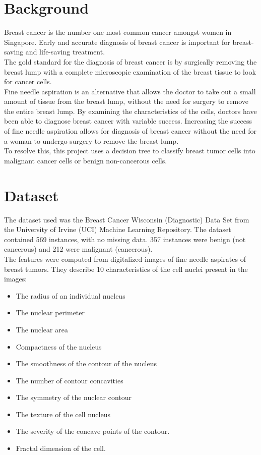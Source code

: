 
\section{Background}
Breast cancer is the number one most common cancer amongst women in Singapore. Early and accurate diagnosis of breast cancer is important for breast-saving and life-saving treatment. \\

The gold standard for the diagnosis of breast cancer is by surgically removing the breast lump with a complete microscopic examination of the breast tissue to look for cancer cells. \\

Fine needle aspiration is an alternative that allows the doctor to take out a small amount of tissue from the breast lump, without the need for surgery to remove the entire breast lump. By examining the characteristics of the cells, doctors have been able to diagnose breast cancer with variable success. Increasing the success of fine needle aspiration allows for diagnosis of breast cancer without the need for a woman to undergo surgery to remove the breast lump. \\

To resolve this, this project uses a decision tree to classify breast tumor cells into malignant cancer cells or benign non-cancerous cells. \\

\section{Dataset}
The dataset used was the Breast Cancer Wisconsin (Diagnostic) Data Set from the University of Irvine (UCI) Machine Learning Repository. The dataset contained 569 instances, with no missing data. 357 instances were benign (not cancerous) and 212 were malignant (cancerous). \\

The features were computed from digitalized images of fine needle aspirates of breast tumors. They describe 10 characteristics of the cell nuclei present in the images:

\begin{itemize}
	\item The radius of an individual nucleus
	\item The nuclear perimeter
	\item The nuclear area
	\item Compactness of the nucleus
	\item The smoothness of the contour of the nucleus
	\item The number of contour concavities
	\item The symmetry of the nuclear contour
	\item The texture of the cell nucleus
        \item The severity of the concave points of the contour. 
        \item Fractal dimension of the cell.
\end{itemize}

